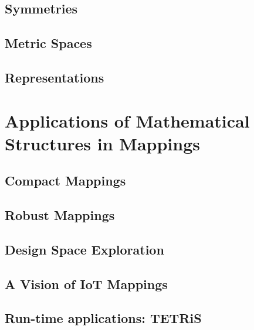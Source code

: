 \documentclass[
		twoside,openright,titlepage,numbers=noenddot,headinclude,%
	 	footinclude=true,cleardoublepage=empty,
		dottedtoc, %
		BCOR=5mm,paper=a4,fontsize=10pt, %
		ngerman,american, %
		]{scrreprt}
\begin{document}
\section{Symmetries}
\label{sec:symmetries}
\section{Metric Spaces}
\label{sec:metric}
\section{Representations}
\label{sec:representations}
%

\chapter{Applications of Mathematical Structures in Mappings}
\label{chap:mapping_applications}

\section{Compact Mappings}
\label{sec:compact}
\section{Robust Mappings}
\label{sec:design_centering}
\section{Design Space Exploration}
\label{sec:dse}
%
\section{A Vision of IoT Mappings}
\label{sec:logic_language}
\section{Run-time applications: TETRiS}
\label{sec:tetris}
\end{document}
